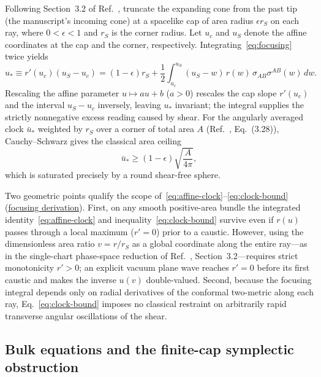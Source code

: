 \documentclass[10pt,a4paper]{article}
\numberwithin{equation}{section}
\newcommand{\repo}[2]{\href{https://github.com/sprajs/quantum-gravity/blob/main/#1}{#2}}
\begin{document}
Following Section~3.2 of Ref.~\cite{Chandrasekaran2026}, truncate the expanding cone from the past tip (the manuscript's incoming cone) at a spacelike cap of area radius $\epsilon r_S$ on each ray, where $0<\epsilon<1$ and $r_S$ is the corner radius.
Let $u_c$ and $u_S$ denote the affine coordinates at the cap and the corner, respectively.
Integrating~\eqref{eq:focusing} twice yields
\begin{equation}
  u_* \equiv r'(u_c)(u_S - u_c)
  = (1-\epsilon)r_S
  + \frac{1}{2}\int_{u_c}^{u_S} (u_S - w)\,r(w)\,\sigma_{AB}\sigma^{AB}(w)\,dw.
  \label{eq:affine-clock}
\end{equation}
Rescaling the affine parameter $u\mapsto a u + b$ ($a>0$) rescales the cap slope $r'(u_c)$ and the interval $u_S-u_c$ inversely, leaving $u_*$ invariant; the integral supplies the strictly nonnegative excess reading caused by shear.
For the angularly averaged clock $\bar{u}_*$ weighted by $r_S$ over a corner of total area $A$ (Ref.~\cite{Chandrasekaran2026}, Eq.~(3.28)), Cauchy--Schwarz gives the classical area ceiling
\begin{equation}
  \bar{u}_* \ge (1-\epsilon)\sqrt{\frac{A}{4\pi}},
  \label{eq:clock-bound}
\end{equation}
which is saturated precisely by a round shear-free sphere.

Two geometric points qualify the scope of~\eqref{eq:affine-clock}--\eqref{eq:clock-bound} (\repo{audit/03-2.md}{focusing derivation}).
First, on any smooth positive-area bundle the integrated identity~\eqref{eq:affine-clock} and inequality~\eqref{eq:clock-bound} survive even if $r(u)$ passes through a local maximum ($r'=0$) prior to a caustic.
However, using the dimensionless area ratio $v=r/r_S$ as a global coordinate along the entire ray---as in the single-chart phase-space reduction of Ref.~\cite{Chandrasekaran2026}, Section~3.2---requires strict monotonicity $r'>0$; an explicit vacuum plane wave reaches $r'=0$ before its first caustic and makes the inverse $u(v)$ double-valued.
Second, because the focusing integral depends only on radial derivatives of the conformal two-metric along each ray, Eq.~\eqref{eq:clock-bound} imposes no classical restraint on arbitrarily rapid transverse angular oscillations of the shear.

\subsection{Bulk equations and the finite-cap symplectic obstruction}
\end{document}
